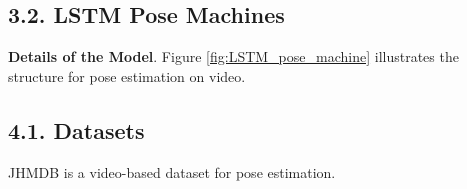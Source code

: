 \documentclass[a4paper]{report}
\begin{document}
\subsection*{3.2. LSTM Pose Machines}
\textbf{Details of the Model}.
Figure \ref{fig:LSTM_pose_machine} illustrates the structure for pose estimation on video.

\subsection*{4.1. Datasets}
JHMDB is a video-based dataset for pose estimation.
\end{document}
